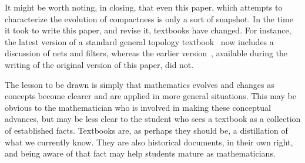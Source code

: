 \documentclass[12pt]{article}
\begin{document}
It might be worth noting, in closing, that even this paper, which attempts to characterize the evolution of compactness is only a sort of snapshot. In the time it took to write this paper, and revise it, textbooks have changed. For instance, the latest version of a standard general topology textbook~\cite{mun2} now includes a discussion of nets and filters, whereas the earlier version~\cite{mun1}, available during the writing of the original version of this paper, did not.

The lesson to be drawn is simply that mathematics evolves and changes as concepts become clearer and are applied in more general situations. This may be obvious to the mathematician who is involved in making these conceptual advances, but may be less clear to the student who sees a textbook as a collection of established facts. Textbooks are, as perhaps they should be, a distillation of what we currently know. They are also historical documents, in their own right, and being aware of that fact may help students mature as mathematicians.



\end{document}

